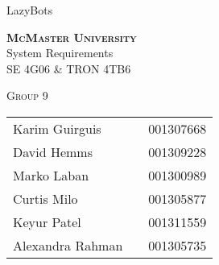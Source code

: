 \documentclass [11pt]{article}
\begin{document}
\begin {center} 

\thispagestyle{empty}
\vspace*{4.5cm}


{\fontfamily{\cabinfamily}\selectfont
\Huge{LazyBots} }

\vspace{1 cm}
{\Large \textbf{\textsc{McMaster University}}\\}  \vspace {1cm}
{\Large System Requirements\\ \vspace {0.4 cm} SE 4G06 \& TRON 4TB6}  \vspace {1cm}

{\large \textsc{Group 9} \\} \vspace{1cm}


\begin{tabular}{ l c  l}
Karim Guirguis & & 001307668 \\
David Hemms & & 001309228 \\
Marko Laban & & 001300989 \\
Curtis Milo & & 001305877 \\
Keyur Patel & & 001311559 \\
Alexandra Rahman & & 001305735
\end{tabular}








\end{center}


\pagebreak


\tableofcontents
\listoftables
\listoffigures



\pagebreak

\end{document}
